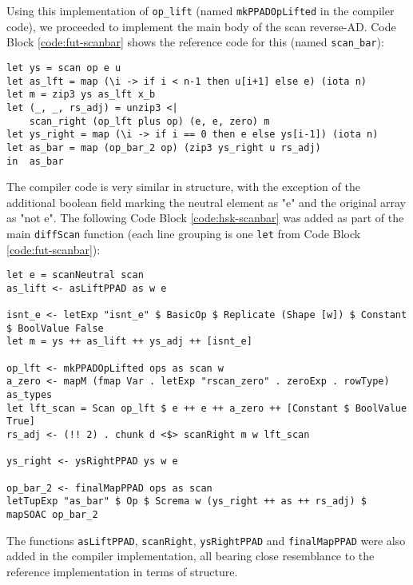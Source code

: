 \documentclass{article}
\newenvironment{code}{\captionsetup{type=listing}}{}
\begin{document}
Using this implementation of \lstinline{op_lift} (named \lstinline{mkPPADOpLifted} in the compiler code), we proceeded to implement the main body of the scan reverse-AD. Code Block \ref{code:fut-scanbar} shows the reference code for this (named \lstinline{scan_bar}):
\newpage
\begin{code}
	\begin{verbatim}
let ys = scan op e u
let as_lft = map (\i -> if i < n-1 then u[i+1] else e) (iota n)
let m = zip3 ys as_lft x_b
let (_, _, rs_adj) = unzip3 <|
    scan_right (op_lft plus op) (e, e, zero) m
let ys_right = map (\i -> if i == 0 then e else ys[i-1]) (iota n)
let as_bar = map (op_bar_2 op) (zip3 ys_right u rs_adj)
in  as_bar
\end{verbatim}
	\caption{Reference Futhark code for \lstinline{scan_bar} (main reverse AD fuction).}
	\label{code:fut-scanbar}
\end{code}
\vspace{0.3cm}
The compiler code is very similar in structure, with the exception of the additional boolean field marking the neutral element as "e" and the original array as "not e". The following Code Block \ref{code:hsk-scanbar} was added as part of the main \lstinline{diffScan} function (each line grouping is one \lstinline{let} from Code Block \ref{code:fut-scanbar}):
\begin{code}
	\begin{verbatim}
let e = scanNeutral scan
as_lift <- asLiftPPAD as w e

isnt_e <- letExp "isnt_e" $ BasicOp $ Replicate (Shape [w]) $ Constant $ BoolValue False
let m = ys ++ as_lift ++ ys_adj ++ [isnt_e]

op_lft <- mkPPADOpLifted ops as scan w
a_zero <- mapM (fmap Var . letExp "rscan_zero" . zeroExp . rowType) as_types
let lft_scan = Scan op_lft $ e ++ e ++ a_zero ++ [Constant $ BoolValue True]
rs_adj <- (!! 2) . chunk d <$> scanRight m w lft_scan

ys_right <- ysRightPPAD ys w e

op_bar_2 <- finalMapPPAD ops as scan
letTupExp "as_bar" $ Op $ Screma w (ys_right ++ as ++ rs_adj) $ mapSOAC op_bar_2
\end{verbatim}
	\caption{Haskell code for \lstinline{scan_bar} (main reverse AD fuction). \lstinline{w} is the length of the arrays in \lstinline{as}.\\}
	\label{code:hsk-scanbar}
\end{code}
\vspace{0.3cm}
The functions \lstinline{asLiftPPAD}, \lstinline{scanRight}, \lstinline{ysRightPPAD} and \lstinline{finalMapPPAD} were also added in the compiler implementation, all bearing close resemblance to the reference implementation in terms of structure.
\end{document}
